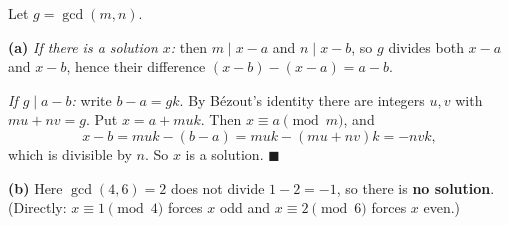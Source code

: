 Let $g=\gcd(m,n)$.

\textbf{(a)} \emph{If there is a solution $x$:} then $m\mid x-a$ and $n\mid x-b$, so $g$ divides both $x-a$ and $x-b$, hence their difference $(x-b)-(x-a)=a-b$.

\emph{If $g\mid a-b$:} write $b-a=gk$. By B\'ezout's identity there are integers $u,v$ with $mu+nv=g$. Put $x=a+muk$. Then $x\equiv a\pmod m$, and
\[x-b=muk-(b-a)=muk-(mu+nv)k=-nvk,\]
which is divisible by $n$. So $x$ is a solution. $\blacksquare$

\textbf{(b)} Here $\gcd(4,6)=2$ does not divide $1-2=-1$, so there is \textbf{no solution}. (Directly: $x\equiv1\pmod4$ forces $x$ odd and $x\equiv2\pmod6$ forces $x$ even.)
